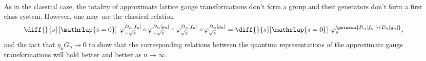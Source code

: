 As in the classical case, the totality of approximate lattice gauge transformations don't form a group and their generators don't form a first class system.
However, one may use the classical relation
\begin{equation}
    \diff{}{s}[\mathrlap{s=0}]\;\, \varphi_{-\sqrt{s}}^{D_n[f_n]}\circ\varphi_{-\sqrt{s}}^{D_n[g_n]}\circ\varphi_{\sqrt{s}}^{D_n[f_n]}\circ\varphi_{\sqrt{s}}^{D_n[g_n]} = \diff{}{s}[\mathrlap{s=0}]\;\, \varphi_{s}^{\poisson{D_n[f_n]}{D_n[g_n]}},
\end{equation}
and the fact that $\eta_n G_n\to 0$ to show that the corresponding relations between the quantum representations of the approximate gauge transformations will hold better and better as $n\to\infty$.
